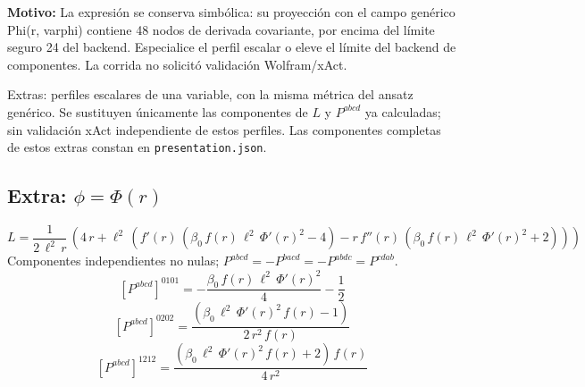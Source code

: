 \documentclass[11pt]{article}
\begin{document}
\par\smallskip\noindent
\textbf{Motivo:} La expresión se conserva simbólica: su proyección con el campo genérico Phi(r, varphi) contiene 48 nodos de derivada covariante, por encima del límite seguro 24 del backend. Especialice el perfil escalar o eleve el límite del backend de componentes. La corrida no solicitó validación Wolfram/xAct.\par
\par\medskip Extras: perfiles escalares de una variable, con la misma métrica del ansatz genérico. Se sustituyen únicamente las componentes de $L$ y $P^{abcd}$ ya calculadas; sin validación xAct independiente de estos perfiles. Las componentes completas de estos extras constan en \texttt{presentation.json}.
\subsection*{Extra: $\phi=\Phi\!\left(r\right)$}
\begin{dmath*}[breakdepth={5}]
L=\frac{1}{2\,{\ell}^{2}\,r}\,\left(4\,r + {\ell}^{2}\,\left(f'\!\left(r\right)\,\left(\beta_{0}\,f\!\left(r\right)\,{\ell}^{2}\,{\Phi'\!\left(r\right)}^{2} - 4\right) - r\,f''\!\left(r\right)\,\left(\beta_{0}\,f\!\left(r\right)\,{\ell}^{2}\,{\Phi'\!\left(r\right)}^{2} + 2\right)\right)\right)
\end{dmath*}
Componentes independientes no nulas; $P^{abcd}=-P^{bacd}=-P^{abdc}=P^{cdab}$.
\begin{dmath*}[breakdepth={5}]
\left[P^{abcd}\right]^{0101}=-\frac{\beta_{0}\,f\!\left(r\right)\,{\ell}^{2}\,{\Phi'\!\left(r\right)}^{2}}{4} - \frac{1}{2}
\end{dmath*}
\begin{dmath*}[breakdepth={5}]
\left[P^{abcd}\right]^{0202}=\frac{\left(\beta_{0}\,{\ell}^{2}\,{\Phi'\!\left(r\right)}^{2}\,f\!\left(r\right) - 1\right)}{2\,{r}^{2}\,f\!\left(r\right)}
\end{dmath*}
\begin{dmath*}[breakdepth={5}]
\left[P^{abcd}\right]^{1212}=\frac{\left(\beta_{0}\,{\ell}^{2}\,{\Phi'\!\left(r\right)}^{2}\,f\!\left(r\right) + 2\right)\,f\!\left(r\right)}{4\,{r}^{2}}
\end{dmath*}
\end{document}
